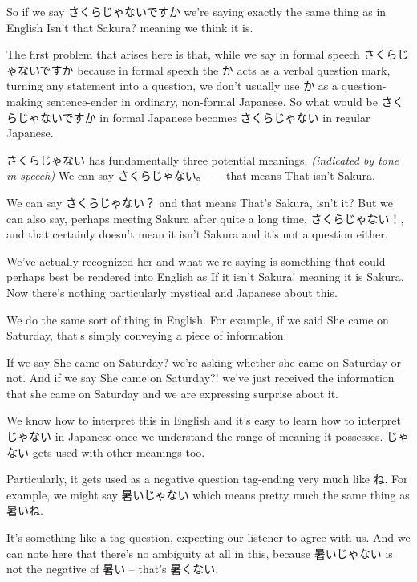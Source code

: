 So if we say さくらじゃないですか we're saying exactly the same thing as in English Isn't that Sakura? meaning we think it is.

{}

The first problem that arises here is that, while we say in formal speech さくらじゃないですか because in formal speech the か acts as a verbal question mark, turning any statement into a question, we don't usually use か as a question-making sentence-ender in ordinary, non-formal Japanese. So what would be さくらじゃないですか in formal Japanese becomes さくらじゃない in regular Japanese.

さくらじゃない has fundamentally three potential meanings. {\em (indicated by tone in speech)} We can say さくらじゃない。 --- that means That isn't Sakura.

We can say さくらじゃない？ and that means That's Sakura, isn't it? But we can also say, perhaps meeting Sakura after quite a long time, さくらじゃない！, and that certainly doesn't mean it isn't Sakura and it's not a question either.

We've actually recognized her and what we're saying is something that could perhaps best be rendered into English as If it isn't Sakura! meaning it is Sakura. Now there's nothing particularly mystical and Japanese about this.

We do the same sort of thing in English. For example, if we said She came on Saturday, that's simply conveying a piece of information.

If we say She came on Saturday? we're asking whether she came on Saturday or not. And if we say She came on Saturday?! we've just received the information that she came on Saturday and we are expressing surprise about it.

{}

We know how to interpret this in English and it's easy to learn how to interpret じゃない in Japanese once we understand the range of meaning it possesses. じゃない gets used with other meanings too.

Particularly, it gets used as a negative question tag-ending very much like ね. For example, we might say 暑いじゃない which means pretty much the same thing as 暑いね.

It's something like a tag-question, expecting our listener to agree with us. And we can note here that there's no ambiguity at all in this, because 暑いじゃない is not the negative of 暑い -- that's 暑くない.

